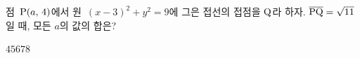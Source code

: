 점~$\mathrm{P}(a,\mkern3mu 4)$에서 원~$(x-3)^2+y^2=9$에 그은 접선의 접점을 $\mathrm{Q}$라 하자. $\overline{\mathrm{PQ}}=\sqrt{11}$일 때, 모든 $a$의 값의 합은?
\begin{choices32}{$4$}{$5$}{$6$}{$7$}{$8$}\end{choices32}
